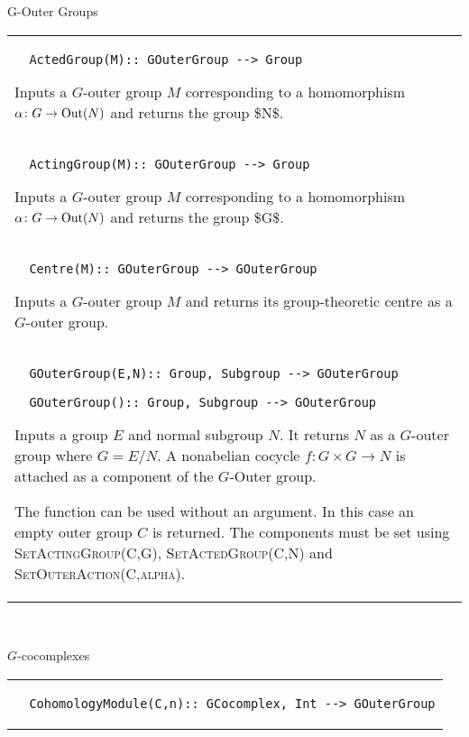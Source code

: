 \documentclass[a4paper,11pt]{report}
\begin{document}
{ G-Outer Groups \begin{center}
\begin{tabular}{|l|} \index{ActedGRoup} 
\begin{verbatim}  ActedGroup(M):: GOuterGroup --> Group
\end{verbatim}


 

 Inputs a $G$-outer group $M$ corresponding to a homomorphism $\alpha\colon G\rightarrow {\rm Out}(N)$ and returns the group \$N\$. \\
 \index{ActingGRoup} 
\begin{verbatim}  ActingGroup(M):: GOuterGroup --> Group
\end{verbatim}


 

 Inputs a $G$-outer group $M$ corresponding to a homomorphism $\alpha\colon G\rightarrow {\rm Out}(N)$ and returns the group \$G\$. \\
 \index{Centre} 
\begin{verbatim}  Centre(M):: GOuterGroup --> GOuterGroup
\end{verbatim}


 

 Inputs a $G$-outer group $M$ and returns its group-theoretic centre as a $G$-outer group. \\
 \index{GOuterGroup} 
\begin{verbatim}  GOuterGroup(E,N):: Group, Subgroup --> GOuterGroup
\end{verbatim}
 
\begin{verbatim}  GOuterGroup():: Group, Subgroup --> GOuterGroup
\end{verbatim}


 

 Inputs a group $E$ and normal subgroup $N$. It returns $N$ as a $G$-outer group where $G=E/N$. A nonabelian cocycle $f\colon G\times G\rightarrow N$ is attached as a component of the $G$-Outer group. 

 The function can be used without an argument. In this case an empty outer
group $C$ is returned. The components must be set using \textsc{SetActingGroup(C,G)}, \textsc{SetActedGroup(C,N)} and \textsc{SetOuterAction(C,alpha)}. \\
\end{tabular}\\[2mm]
\end{center}

 $G$-cocomplexes \begin{center}
\begin{tabular}{|l|} \index{CohomologyModule} 
\begin{verbatim}  CohomologyModule(C,n):: GCocomplex, Int --> GOuterGroup
\end{verbatim}



\end{tabular}
\end{center}}
\end{document}
